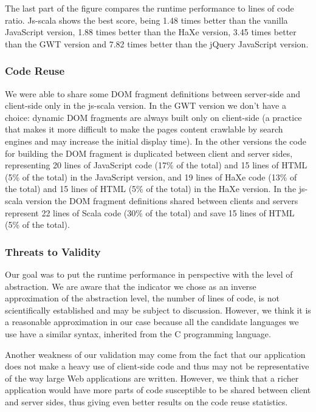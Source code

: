 \documentclass{llncs}
\begin{document}
The last part of the figure compares the runtime performance to lines of code ratio. Js-scala shows
the best score, being 1.48 times better than the vanilla JavaScript version, 1.88 times better than
the HaXe version, 3.45 times better than the GWT version and 7.82 times better than the jQuery
JavaScript version.

\subsubsection{Code Reuse}

We were able to share some DOM fragment definitions between server-side and client-side only in
the js-scala version. In the GWT version we don’t have a choice: dynamic DOM fragments are always
built only on client-side (a practice that makes it more difficult to make the pages content
crawlable by search engines and may increase the initial display time). In the other versions the
code for building the DOM fragment is duplicated between client and server sides, representing 20
lines of JavaScript code (17\% of the total) and 15 lines of HTML (5\% of the total) in the
JavaScript version, and 19 lines of HaXe code (13\% of the total) and 15 lines of HTML (5\%
of the total) in the HaXe version. In the js-scala version the DOM fragment definitions shared
between clients and servers represent 22 lines of Scala code (30\% of the total) and save 15 lines
of HTML (5\% of the total).

\subsubsection{Threats to Validity}

Our goal was to put the runtime performance in perspective with the level of abstraction. We are
aware that the indicator we chose as an inverse approximation of the abstraction level, the number
of lines of code, is not scientifically established and may be subject to discussion. However, we
think it is a reasonable approximation in our case because all the candidate languages we use have
a similar syntax, inherited from the C programming language.

Another weakness of our validation may come from the fact that our application does not make a
heavy use of client-side code and thus may not be representative of the way large Web applications
are written. However, we think that a richer application would have more parts of code susceptible
to be shared between client and server sides, thus giving even better results on the code reuse
statistics.
\end{document}
